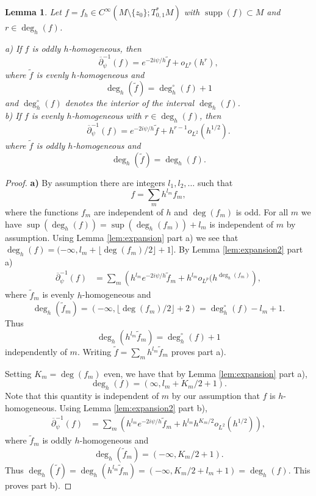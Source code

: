 \documentclass[12pt]{amsart}
\def\p{\partial}
\DeclareMathOperator{\supp}{supp}
\newtheorem{lemma}[theorem]{Lemma}
\theoremstyle{definition}
\theoremstyle{remark}
\newcommand{\op}{\overline \p}
\begin{document}
\begin{lemma}\label{lem:expansion3}
 Let $f=f_h\in  C^\infty(M\setminus \{z_0\}; T^*_{0,1}M)$ with $\supp(f) \subset M$ and $r\in \deg_h(f)$.
 
 \noindent a) If $f$ is oddly $h$-homogeneous,  then 
 \[
  \op_\psi^{-1}(f)=e^{-2i\psi/h}\tilde f+ o_{L^p}(h^r),
 \]
where $\tilde f$ is evenly $h$-homogeneous and 
\[
 \deg_h(\tilde f)=\deg_h^\circ(f) +1
\]
and $\deg_h^\circ(f)$ denotes the interior of the interval $\deg_h(f)$.\\
\noindent b) If $f$ is evenly $h$-homogeneous with $r\in \deg_h(f)$, then 
 \[
  \op_\psi^{-1}(f)=e^{-2i\psi/h}\tilde f+ h^{r-1}o_{L^2}(h^{1/2}).%
 \]
where $\tilde f$ is oddly $h$-homogeneous and 
\[
 \deg_h(\tilde f)=\deg_h(f). 
\]
\end{lemma}
\begin{proof}
\textbf{a)} By assumption there are integers $l_1,l_2,\ldots$ such that
 \[
 f=\sum_{m} h^{l_m} f_m,               
\]
where the functions $f_m$ are independent of $h$ and $\deg(f_m)$ is odd. For all $m$ we have $ \sup \left(\deg_h(f)\right)= \sup \left(\deg_h( f_m) \right) + l_m$ is independent of $m$ by assumption. Using {\color{black} Lemma \ref{lem:expansion} part a)} we see that $\deg_h(f)=(-\infty, l_m+\lfloor \deg(f_m)/2\rfloor +1]$. By Lemma \ref{lem:expansion2} part a)
\begin{align*}
 \op_\psi^{-1}(f)&=\sum_{m} \left(h^{l_m}e^{-2i\psi/h}\tilde f_m+ h^{l_m}o_{L^p}(h^{\deg_h(f_m)}\right),
\end{align*}
where $\tilde f_m$ is evenly $h$-homogeneous and 
\[
 \deg_h(\tilde f_m)=(-\infty, \lfloor \deg( f_m)/2\rfloor+2)= \deg_h^\circ(f)-l_m+1.
\]
Thus 
\[
 \deg_h(h^{l_m}\tilde f_m)=\deg_h^\circ(f)+1 
\]
independently of $m$.
Writing $\tilde f=\sum_m h^{l_m}\tilde f_m$ proves part a). 

Setting $K_m = \deg(f_m)$ even, we have that by Lemma \ref{lem:expansion} part a),  
$$\deg_h(f) =(\infty, l_m +K_m/2 +1). $$
Note that this quantity is independent of $m$ by our assumption that $f$ is $h$-homogeneous. Using Lemma \ref{lem:expansion2} part b),
\begin{align*}
 \op_\psi^{-1}(f)&=\sum_{m} \left(h^{l_m}e^{-2i\psi/h}\tilde f_m+ h^{l_m}h^{K_m/2}o_{L^2}(h^{1/2})\right),
\end{align*}
where $\tilde f_m$ is oddly $h$-homogeneous and 
\[
 \deg_h(\tilde f_m)=(-\infty, K_m/2+1).%
\]
Thus $\deg_h(\tilde f) = \deg_h(h^{l_m}\tilde f_m)=(-\infty, K_m/2 + l_m +1) = \deg_h(f)$. This proves part b).
\end{proof}
\end{document}

